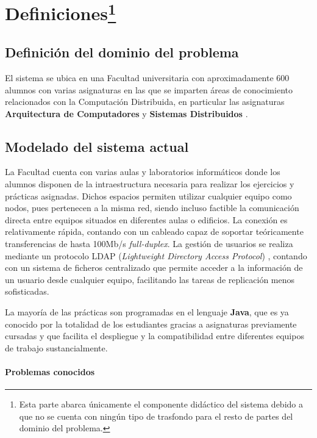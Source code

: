 \documentclass{article}
\newcounter{undefinedreferences}
\begin{document}
\section{Definiciones\protect\footnote{Esta parte abarca únicamente el componente didáctico del sistema debido a que no se cuenta con ningún tipo de trasfondo para el resto de partes del dominio del problema.}}

\subsection{Definición del dominio del problema}

El sistema se ubica en una Facultad universitaria con aproximadamente 600 alumnos  con varias asignaturas en las que se imparten áreas de conocimiento relacionados con la Computación Distribuida, en particular las asignaturas \textbf{Arquitectura de Computadores} y \textbf{Sistemas Distribuidos} \cite{DIA15GuiaAcademica}.

\subsection{Modelado del sistema actual}

La Facultad cuenta con varias aulas y laboratorios informáticos donde los alumnos disponen de la intraestructura necesaria para realizar los ejercicios y prácticas asignadas. Dichos espacios permiten utilizar cualquier equipo como nodos, pues pertenecen a la misma red, siendo incluso factible la comunicación directa entre equipos situados en diferentes aulas o edificios. La conexión es relativamente rápida, contando con un cableado capaz de soportar teóricamente transferencias de hasta 100Mb/s \textit{full-duplex}. La gestión de usuarios se realiza mediante un protocolo LDAP (\textit{Lightweight Directory Access Protocol}) \cite{RFC4516-comment}, contando con un sistema de ficheros centralizado que permite acceder a la información de un usuario desde cualquier equipo, facilitando las tareas de replicación menos sofisticadas.

La mayoría de las prácticas son programadas en el lenguaje \textbf{Java}, que es ya conocido por la totalidad de los estudiantes gracias a asignaturas previamente cursadas  y que facilita el despliegue y la compatibilidad entre diferentes equipos de trabajo sustancialmente.

\paragraph{Problemas conocidos}
\end{document}
